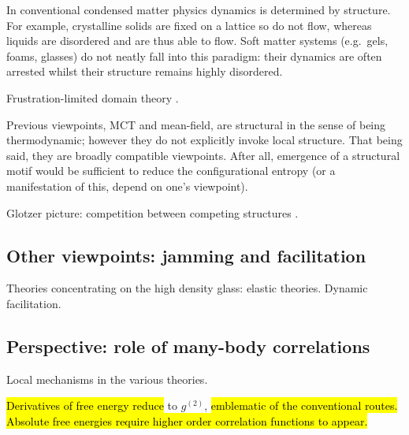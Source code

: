 In conventional condensed matter physics dynamics is determined by structure.
For example, crystalline solids are fixed on a lattice so do not flow, whereas liquids are disordered and are thus able to flow.
Soft matter systems (e.g.\ gels, foams, glasses) do not neatly fall into this paradigm: their dynamics are often arrested whilst their structure remains highly disordered.

Frustration-limited domain theory \cite{TarjusJPCM2005}.

Previous viewpoints, MCT and mean-field, are structural in the sense of being thermodynamic; however they do not explicitly invoke local structure.
That being said, they are broadly compatible viewpoints.
After all, emergence of a structural motif would be sufficient to reduce the configurational entropy (or a manifestation of this, depend on one's viewpoint).

Glotzer picture: competition between competing structures \cite{TeichNC2019}.

\subsection{Other viewpoints: jamming and facilitation}

Theories concentrating on the high density glass: elastic theories.
Dynamic facilitation.

\subsection{Perspective: role of many-body correlations}

Local mechanisms in the various theories.

\hl{Derivatives of free energy reduce} to $g^{(2)}$,\hl{ emblematic of the conventional routes.
Absolute free energies require higher order correlation functions to appear.}

